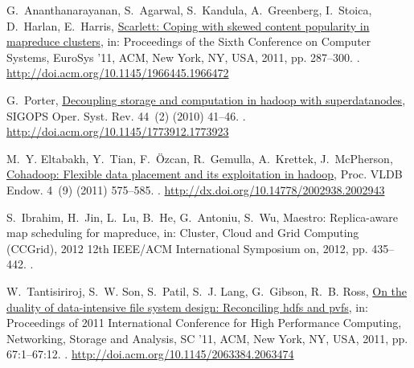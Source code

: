 \documentclass[preprint,12pt]{elsarticle}
\begin{document}
\begin{thebibliography}{10}
G.~Ananthanarayanan, S.~Agarwal, S.~Kandula, A.~Greenberg, I.~Stoica,
  D.~Harlan, E.~Harris,
  \href{http://doi.acm.org/10.1145/1966445.1966472}{Scarlett: Coping with
  skewed content popularity in mapreduce clusters}, in: Proceedings of the
  Sixth Conference on Computer Systems, EuroSys '11, ACM, New York, NY, USA,
  2011, pp. 287--300.
\newblock \href {http://dx.doi.org/10.1145/1966445.1966472}
  {}.
\newline\urlprefix\url{http://doi.acm.org/10.1145/1966445.1966472}

G.~Porter, \href{http://doi.acm.org/10.1145/1773912.1773923}{Decoupling storage
  and computation in hadoop with superdatanodes}, SIGOPS Oper. Syst. Rev.
  44~(2) (2010) 41--46.
\newblock \href {http://dx.doi.org/10.1145/1773912.1773923}
  {}.
\newline\urlprefix\url{http://doi.acm.org/10.1145/1773912.1773923}

M.~Y. Eltabakh, Y.~Tian, F.~\"{O}zcan, R.~Gemulla, A.~Krettek, J.~McPherson,
  \href{http://dx.doi.org/10.14778/2002938.2002943}{Cohadoop: Flexible data
  placement and its exploitation in hadoop}, Proc. VLDB Endow. 4~(9) (2011)
  575--585.
\newblock \href {http://dx.doi.org/10.14778/2002938.2002943}
  {}.
\newline\urlprefix\url{http://dx.doi.org/10.14778/2002938.2002943}

S.~Ibrahim, H.~Jin, L.~Lu, B.~He, G.~Antoniu, S.~Wu, Maestro: Replica-aware map
  scheduling for mapreduce, in: Cluster, Cloud and Grid Computing (CCGrid),
  2012 12th IEEE/ACM International Symposium on, 2012, pp. 435--442.
\newblock \href {http://dx.doi.org/10.1109/CCGrid.2012.122}
  {}.

W.~Tantisiriroj, S.~W. Son, S.~Patil, S.~J. Lang, G.~Gibson, R.~B. Ross,
  \href{http://doi.acm.org/10.1145/2063384.2063474}{On the duality of
  data-intensive file system design: Reconciling hdfs and pvfs}, in:
  Proceedings of 2011 International Conference for High Performance Computing,
  Networking, Storage and Analysis, SC '11, ACM, New York, NY, USA, 2011, pp.
  67:1--67:12.
\newblock \href {http://dx.doi.org/10.1145/2063384.2063474}
  {}.
\newline\urlprefix\url{http://doi.acm.org/10.1145/2063384.2063474}


\end{thebibliography}
\end{document}
